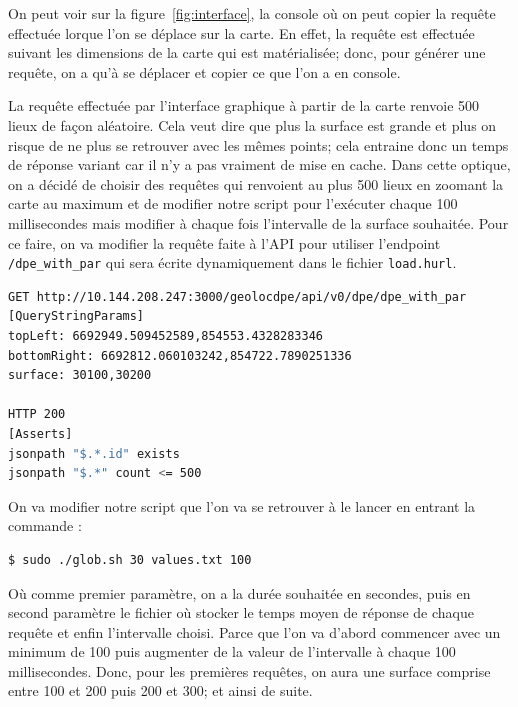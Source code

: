 On peut voir sur la figure~\ref{fig:interface}, la console o\`u on peut copier la requ\^ete effectu\'ee lorque l'on se d\'eplace sur la carte. En effet, la requ\^ete est effectu\'ee suivant les dimensions de la carte qui est mat\'erialis\'ee; 
donc, pour g\'en\'erer une requ\^ete, on a qu'\`a se d\'eplacer et copier ce que l'on a en console.

La requ\^ete effectu\'ee par l'interface graphique \`a partir de la carte renvoie 500 lieux de fa\c{c}on al\'eatoire. Cela veut dire que plus la surface est grande et plus on risque de ne plus se retrouver avec les m\^emes points; 
cela entraine donc un temps de r\'eponse variant car il n'y a pas vraiment de mise en cache. Dans cette optique, on a d\'ecid\'e de choisir des requ\^etes qui renvoient au plus 500 lieux en zoomant la carte au maximum et 
de modifier notre script pour l'ex\'ecuter chaque 100 millisecondes mais modifier \`a chaque fois l'intervalle de la surface souhait\'ee. Pour ce faire, on va modifier la requ\^ete faite \`a l'API pour utiliser l'endpoint 
\lstinline{/dpe_with_par} qui sera \'ecrite dynamiquement dans le fichier \texttt{load.hurl}.

\begin{lstlisting}[language=bash, frame=single, title={load.hurl}, breaklines]
GET http://10.144.208.247:3000/geolocdpe/api/v0/dpe/dpe_with_par
[QueryStringParams]
topLeft: 6692949.509452589,854553.4328283346
bottomRight: 6692812.060103242,854722.7890251336
surface: 30100,30200

HTTP 200
[Asserts]
jsonpath "$.*.id" exists
jsonpath "$.*" count <= 500
\end{lstlisting}

On va modifier notre script que l'on va se retrouver \`a le lancer en entrant la commande : 
\begin{lstlisting}[frame=single]
$ sudo ./glob.sh 30 values.txt 100
\end{lstlisting}

O\`u comme premier param\`etre, on a la dur\'ee souhait\'ee en secondes, puis en second param\`etre le fichier o\`u stocker le temps moyen de r\'eponse de chaque requ\^ete et enfin l'intervalle choisi. 
Parce que l'on va d'abord commencer avec un minimum de 100 puis augmenter de la valeur de l'intervalle \`a chaque 100 millisecondes. Donc, pour les premi\`eres requ\^etes, on aura une surface 
comprise entre 100 et 200 puis 200 et 300; et ainsi de suite.

